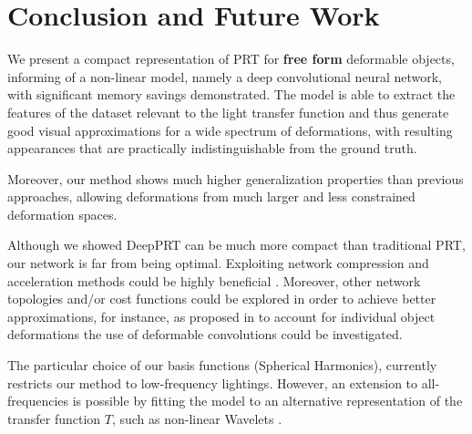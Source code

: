 \section{Conclusion and Future Work}
We present a compact representation of PRT for \textbf{free form} deformable objects, informing of a non-linear model, namely a deep convolutional neural network, with significant memory savings demonstrated.
 The model is able to extract the features of the dataset relevant to the light transfer function and thus generate good visual approximations for a wide spectrum of deformations, with resulting appearances that are practically indistinguishable from the ground truth.  

Moreover, our method shows much higher generalization properties than previous approaches, allowing deformations from much larger and less constrained deformation spaces.

Although we showed DeepPRT can be much more compact than traditional PRT, our network is far from being optimal. Exploiting network compression and acceleration methods could be highly beneficial \cite{Survey_NN_Compression, Deep_Compression}.
Moreover, other network topologies and/or cost functions could be explored in order to achieve better approximations, for instance, as proposed in \cite{Deformable_UNet} to account for individual object deformations the use of deformable convolutions \cite{DeformableCNN} could be investigated.

The particular choice of our basis functions (Spherical Harmonics), currently restricts our method to low-frequency lightings. However, an extension to all-frequencies is possible by fitting the model to an alternative representation of the transfer function $T$, such as non-linear Wavelets \cite{AllFrequencyPRT}.

